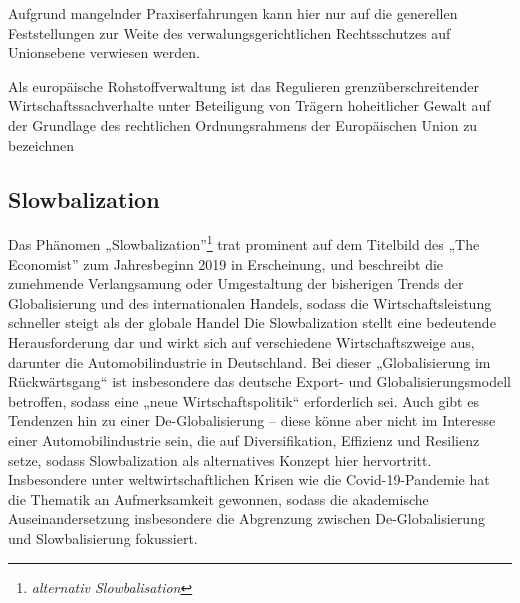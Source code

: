 \documentclass[12pt,a4paper,oneside]{book} %
\begin{document}
	Aufgrund mangelnder Praxiserfahrungen kann hier nur auf die generellen Feststellungen zur Weite des verwalungsgerichtlichen Rechtsschutzes auf Unionsebene verwiesen werden.
	
	
	\glqq Als europäische Rohstoffverwaltung ist das Regulieren grenzüberschreitender Wirtschaftssachverhalte unter Beteiligung von Trägern hoheitlicher Gewalt auf der Grundlage des rechtlichen Ordnungsrahmens der Europäischen Union zu bezeichnen\grqq \autocite{Schorkopf, Europäische Rohstoffverwaltung, Rn. 2}
	
	\subsection{Slowbalization}
	Das Phänomen „Slowbalization”\footnote{\textit{alternativ Slowbalisation}} trat prominent auf dem Titelbild des „The Economist” zum Jahresbeginn 2019\autocite{economist_slowbalisation_2019} in Erscheinung, und beschreibt die zunehmende Verlangsamung oder Umgestaltung der bisherigen Trends der Globalisierung und des internationalen Handels, sodass die Wirtschaftsleistung schneller steigt als der globale Handel%
	Die Slowbalization stellt eine bedeutende Herausforderung dar und wirkt sich auf verschiedene Wirtschaftszweige aus, darunter die Automobilindustrie in Deutschland. Bei dieser „Globalisierung im Rückwärtsgang“ ist insbesondere das deutsche Export- und Globalisierungsmodell betroffen, sodass eine „neue Wirtschaftspolitik“ erforderlich sei.\autocite{maier_globalisierung_2019} Auch gibt es Tendenzen hin zu einer De-Globalisierung – diese könne aber nicht im Interesse einer Automobilindustrie sein, die auf Diversifikation, Effizienz und Resilienz setze,\autocite{rade_globalisierung_2022} sodass Slowbalization als alternatives Konzept hier hervortritt. Insbesondere unter weltwirtschaftlichen Krisen wie die Covid-19-Pandemie hat die Thematik an Aufmerksamkeit gewonnen, sodass die akademische Auseinandersetzung insbesondere die Abgrenzung zwischen De-Globalisierung und Slowbalisierung fokussiert.\autocites{dalla_longa_urban_2023}{inferrera_globalisation_2021}
	
	
\end{document}
